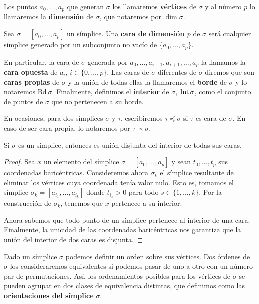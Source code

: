 Los puntos $a_{0}, \ldots, a_{p}$ que generan $\sigma$ los llamaremos \textbf{vértices}
de $\sigma$ y al número $p$ lo llamaremos la \textbf{dimensión} de $\sigma$, que
notaremos por $\dim \sigma$.

\begin{definicion}
	Sea $\sigma=[a_{0}, \ldots, a_{p}]$ un símplice. Una \textbf{cara de dimensión
		$p$} de $\sigma$ será cualquier símplice generado por un subconjunto no vacío de
	$\{a_{0}, \ldots, a_{p}\}$.
\end{definicion}
En particular, la cara de $\sigma$ generada por
$a_{0}, \ldots, a_{i-1}, a_{i+1}, \ldots, a_{p}$ la llamamos la \textbf{cara
	opuesta} de $a_{i}$, $i \in \{0, \ldots, p\}$. Las caras de $\sigma$ diferentes de
$\sigma$ diremos que son \textbf{caras propias} de $\sigma$ y la unión de todas
ellas la llamaremos el \textbf{borde} de $\sigma$ y lo notaremos $\text{Bd}\ \sigma$.
Finalmente, definimos el \textbf{interior} de $\sigma$, $\operatorname{Int} \sigma$, como
el conjunto de puntos de $\sigma$ que no pertenecen a su borde.

En ocasiones, para dos símplices $\sigma$ y $\tau$, escribiremos
$\tau \preceq \sigma$ si $\tau$ es cara de $\sigma$. En caso de ser cara propia,
lo notaremos por $\tau \prec \sigma$.

\begin{proposicion}
	\label{prop:union-disjunta-simplices} Si $\sigma$ es un símplice, entonces es
	unión disjunta del interior de todas sus caras.
\end{proposicion}
\begin{proof}
	Sea $x$ un elemento del símplice $\sigma = [a_{0},\ldots,a_{p}]$ y sean $t_{0},
	\ldots ,t_{p}$ sus coordenadas baricéntricas. Consideremos ahora $\sigma_{k}$
	el símplice resultante de eliminar los vértices cuya coordenada tenía valor
	nulo. Esto es, tomamos el símplice $\sigma_{k}= [a_{i_1}, \ldots, a_{i_k}]$
	donde $t_{i_s}> 0$ para todo $s \in \{1, \ldots, k\}$. Por la construcción de $\sigma
	_{k}$, tenemos que $x$ pertenece a su interior.
	
	Ahora sabemos que todo punto de un símplice pertenece al interior de una cara.
	Finalmente, la unicidad de las coordenadas baricéntricas nos garantiza que la
	unión del interior de dos caras es disjunta.
\end{proof}

Dado un símplice $\sigma$ podemos definir un orden sobre sus vértices. Dos
órdenes de $\sigma$ los consideraremos equivalentes si podemos pasar de uno a
otro con un número par de permutaciones. Así, los ordenamientos posibles para
los vértices de $\sigma$ se pueden agrupar en dos clases de equivalencia
distintas, que definimos como las \textbf{orientaciones del símplice} $\sigma$.

